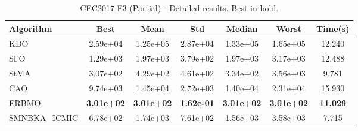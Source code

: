 \begin{table}[H]
\centering\small
\caption{CEC2017 F3 (Partial) - Detailed results. Best in bold.}
\label{tab:cec2017_F3}
\begin{tabular}{lcccccc}
\toprule
\textbf{Algorithm} & \textbf{Best} & \textbf{Mean} & \textbf{Std} & \textbf{Median} & \textbf{Worst} & \textbf{Time(s)} \\
\midrule
KDO & 2.59e+04 & 1.25e+05 & 2.87e+04 & 1.33e+05 & 1.65e+05 & 12.240 \\
SFO & 1.29e+03 & 1.97e+03 & 3.79e+02 & 1.97e+03 & 3.17e+03 & 12.488 \\
StMA & 3.07e+02 & 4.29e+02 & 4.61e+02 & 3.34e+02 & 3.56e+03 & 9.781 \\
CAO & 9.74e+03 & 1.45e+04 & 2.72e+03 & 1.40e+04 & 2.31e+04 & 15.930 \\
ERBMO & \textbf{3.01e+02} & \textbf{3.01e+02} & \textbf{1.62e-01} & \textbf{3.01e+02} & \textbf{3.01e+02} & \textbf{11.029} \\
SMNBKA_ICMIC & 6.78e+02 & 1.74e+03 & 7.61e+02 & 1.56e+03 & 3.58e+03 & 7.715 \\
\bottomrule
\end{tabular}
\end{table}
